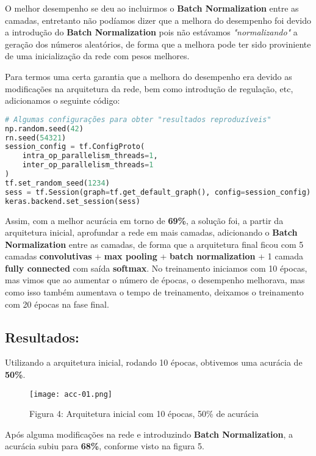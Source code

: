 O melhor desempenho se deu ao incluirmos o \textbf{Batch Normalization} entre as
camadas, entretanto não podíamos dizer que a melhora do desempenho foi devido a
introdução do \textbf{Batch Normalization} pois não estávamos
\emph{"normalizando"} a geração dos números aleatórios, de forma que a
melhora pode ter sido proviniente de uma inicialização da rede com pesos
melhores.

Para termos uma certa garantia que a melhora do desempenho era devido as
modificações na arquitetura da rede, bem como introdução de regulação,
etc, adicionamos o seguinte código:

\begin{lstlisting}[language=Python]
# Algumas configurações para obter "resultados reproduzíveis"
np.random.seed(42)
rn.seed(54321)
session_config = tf.ConfigProto(
    intra_op_parallelism_threads=1,
    inter_op_parallelism_threads=1
)
tf.set_random_seed(1234)
sess = tf.Session(graph=tf.get_default_graph(), config=session_config)
keras.backend.set_session(sess)

\end{lstlisting}

Assim, com a melhor acurácia em torno de \textbf{69\%}, a solução
foi, a partir da arquitetura inicial, aprofundar a rede em mais camadas,
adicionando o \textbf{Batch Normalization} entre as camadas, de forma
que a arquitetura final ficou com 5 camadas \textbf{convolutivas} +
\textbf{max pooling} + \textbf{batch normalization} + 1 camada
\textbf{fully connected} com saída \textbf{softmax}. No treinamento
iniciamos com 10 épocas, mas vimos que ao aumentar o número de épocas, o
desempenho melhorava, mas como isso também aumentava o tempo de
treinamento, deixamos o treinamento com 20 épocas na fase final.

    \subsection{Resultados:}\label{resultados}

    Utilizando a arquitetura inicial, rodando 10 épocas, obtivemos uma acurácia de \textbf{50\%}.

\begin{figure}[ht]
\centering
\texttt{[image: acc-01.png]}
\caption{Figura 4: Arquitetura inicial com 10 épocas, 50\% de acurácia}
\end{figure}

Após alguma modificações na rede e introduzindo \textbf{Batch Normalization}, a acurácia subiu para
\textbf{68\%}, conforme visto na figura 5.

